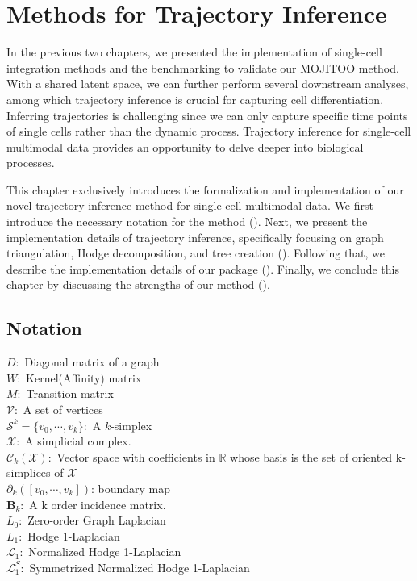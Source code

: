 %
\chapter{Methods for Trajectory Inference}
\label{chapter:methods_TI}
\graphicspath{{chapter5/figs}}

In the previous two chapters, we presented the implementation of single-cell integration methods and the benchmarking to validate our MOJITOO method. With a shared latent space, we can further perform several downstream analyses, among which trajectory inference is crucial for capturing cell differentiation. Inferring trajectories is challenging since we can only capture specific time points of single cells rather than the dynamic process. Trajectory inference for single-cell multimodal data provides an opportunity to delve deeper into biological processes.

This chapter exclusively introduces the formalization and implementation of our novel trajectory inference method for single-cell multimodal data. We first introduce the necessary notation for the method (). Next, we present the implementation details of trajectory inference, specifically focusing on graph triangulation, Hodge decomposition, and tree creation (). Following that, we describe the implementation details of our package (). Finally, we conclude this chapter by discussing the strengths of our method ().


\section{Notation} \label{TI_methods:notation}

$D: $ Diagonal matrix of a graph\\
$W: $ Kernel(Affinity) matrix \\
$M: $ Transition matrix \\
$\mathcal{V}: $ A set of vertices\\
$\mathcal{S}^k = \{{v}_0,\cdots,{v}_k \}: $ A $k$-simplex\\
$\mathcal{X}: $ A simplicial complex.\\
$\mathcal{C}_k(\mathcal{X}): $ Vector space with coefficients in $\mathbb{R}$ whose basis is the set of oriented k-simplices of $\mathcal{X}$\\
$\partial_k ([v_0,\cdots, v_k])$: boundary map\\
$\mathbf{B}_k: $ A k order incidence matrix.\\
$L_0: $ Zero-order Graph Laplacian\\
$L_1: $ Hodge 1-Laplacian\\
$\mathcal{L}_1: $ Normalized Hodge 1-Laplacian\\
$\mathcal{L}_1^S: $ Symmetrized Normalized Hodge 1-Laplacian\\
